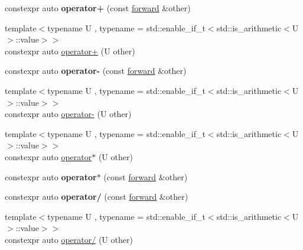\begin{DoxyCompactItemize}
constexpr auto {\bfseries operator+} (const \hyperlink{classnumpp_1_1differentiation_1_1automatic_1_1forward}{forward} \&other)
\item 
{\footnotesize template$<$typename U , typename  = std\+::enable\+\_\+if\+\_\+t$<$std\+::is\+\_\+arithmetic$<$\+U$>$\+::value$>$$>$ }\\constexpr auto \hyperlink{classnumpp_1_1differentiation_1_1automatic_1_1forward_ac97b21e3e666a20f4f731a65faafae79}{operator+} (U other)
\item 
\mbox{\label{classnumpp_1_1differentiation_1_1automatic_1_1forward_a4f7666eff1d116c6b7c3d9aefe19d69c}} 
constexpr auto {\bfseries operator-\/} (const \hyperlink{classnumpp_1_1differentiation_1_1automatic_1_1forward}{forward} \&other)
\item 
{\footnotesize template$<$typename U , typename  = std\+::enable\+\_\+if\+\_\+t$<$std\+::is\+\_\+arithmetic$<$\+U$>$\+::value$>$$>$ }\\constexpr auto \hyperlink{classnumpp_1_1differentiation_1_1automatic_1_1forward_afe3627daed4fc827b0e31886ddfd5dd9}{operator-\/} (U other)
\item 
{\footnotesize template$<$typename U , typename  = std\+::enable\+\_\+if\+\_\+t$<$std\+::is\+\_\+arithmetic$<$\+U$>$\+::value$>$$>$ }\\constexpr auto \hyperlink{classnumpp_1_1differentiation_1_1automatic_1_1forward_a006d157f743938e11eb54668c41da769}{operator$\ast$} (U other)
\item 
\mbox{\label{classnumpp_1_1differentiation_1_1automatic_1_1forward_a021e057d791fb9786c0a5cd0f1c35fbe}} 
constexpr auto {\bfseries operator$\ast$} (const \hyperlink{classnumpp_1_1differentiation_1_1automatic_1_1forward}{forward} \&other)
\item 
\mbox{\label{classnumpp_1_1differentiation_1_1automatic_1_1forward_a1e7b473c400fcf510d8d24712821e72e}} 
constexpr auto {\bfseries operator/} (const \hyperlink{classnumpp_1_1differentiation_1_1automatic_1_1forward}{forward} \&other)
\item 
{\footnotesize template$<$typename U , typename  = std\+::enable\+\_\+if\+\_\+t$<$std\+::is\+\_\+arithmetic$<$\+U$>$\+::value$>$$>$ }\\constexpr auto \hyperlink{classnumpp_1_1differentiation_1_1automatic_1_1forward_a630cf420f7160392da3f4c575b2d8e66}{operator/} (U other)
\end{DoxyCompactItemize}
